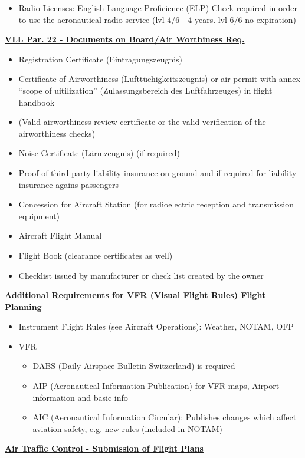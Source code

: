 \documentclass[9pt, landscape, fleqn]{scrartcl}
\begin{document}
\begin{multicols*}{3}
\begin{itemize}
\begin{itemize}
    \end{itemize}
    \item Radio Licenses: English Language Proficience (ELP) Check required in order to use the aeronautical radio service (lvl 4/6 - 4 years. lvl 6/6 no expiration)
\end{itemize}
\underline{\textbf{VLL Par. 22 - Documents on Board/Air Worthiness Req.}}
\begin{itemize}
    \item Registration Certificate (Eintragungszeugnis)
    \item Certificate of Airworthiness (Lufttüchigkeitszeugnis) or air permit with annex ``scope of uitilization'' (Zulassungsbereich des Luftfahrzeuges) in flight handbook
    \item (Valid airworthiness review certificate or the valid verification of the airworthiness checks)
    \item Noise Certificate (Lärmzeugnis) (if required)
    \item Proof of third party liability insurance on ground and if required for liability insurance agains passengers 
    \item Concession for Aircraft Station (for radioelectric reception and transmission equipment)
    \item Aircraft Flight Manual 
    \item Flight Book (clearance certificates as well)
    \item Checklist issued by manufacturer or check list created by the owner  
\end{itemize}
\underline{\textbf{Additional Requirements for VFR (Visual Flight Rules) Flight Planning}}
\begin{itemize}
    \item Instrument Flight Rules (see Aircraft Operations): Weather, NOTAM, OFP 
    \item VFR
    \begin{itemize}
        \item DABS (Daily Airspace Bulletin Switzerland) is required 
        \item AIP (Aeronautical Information Publication) for VFR maps, Airport information and basic info 
        \item AIC (Aeronautical Information Circular): Publishes changes which affect aviation safety, e.g. new rules (included in NOTAM)
    \end{itemize}
\end{itemize}
\underline{\textbf{Air Traffic Control - Submission of Flight Plans}}

\end{multicols*}
\end{document}
